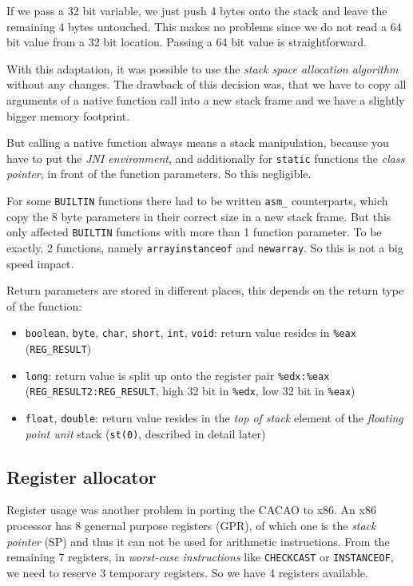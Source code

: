 If we pass a 32 bit variable, we just push 4 bytes onto the stack and
leave the remaining 4 bytes untouched. This makes no problems since we
do not read a 64 bit value from a 32 bit location. Passing a 64 bit
value is straightforward.

With this adaptation, it was possible to use the \textit{stack space
allocation algorithm} without any changes. The drawback of this
decision was, that we have to copy all arguments of a native function
call into a new stack frame and we have a slightly bigger memory
footprint.

But calling a native function always means a stack manipulation,
because you have to put the \textit{JNI environment}, and additionally
for \texttt{static} functions the \textit{class pointer}, in front of
the function parameters. So this negligible.

For some \texttt{BUILTIN} functions there had to be written
\texttt{asm\_} counterparts, which copy the 8 byte parameters in their
correct size in a new stack frame. But this only affected
\texttt{BUILTIN} functions with more than 1 function parameter. To be
exactly, 2 functions, namely \texttt{arrayinstanceof} and
\texttt{newarray}. So this is not a big speed impact.

Return parameters are stored in different places, this depends on the
return type of the function:

\begin{itemize}
 \item \texttt{boolean}, \texttt{byte}, \texttt{char}, \texttt{short},
 \texttt{int}, \texttt{void}: return value resides in \texttt{\%eax}
 (\texttt{REG\_RESULT})

 \item \texttt{long}: return value is split up onto the register pair
 \texttt{\%edx:\%eax}
 (\texttt{REG\_RESULT2:REG\_RESULT}, high 32 bit in
 \texttt{\%edx}, low 32 bit in \texttt{\%eax})

 \item \texttt{float}, \texttt{double}: return value resides in the
 \textit{top of stack} element of the \textit{floating point unit}
 stack (\texttt{st(0)}, described in detail later)
\end{itemize}


\subsection{Register allocator}

Register usage was another problem in porting the CACAO to x86. An x86
processor has 8 genernal purpose registers (GPR), of which one is the
\textit{stack pointer} (SP) and thus it can not be used for arithmetic
instructions. From the remaining 7 registers, in \textit{worst-case
instructions} like \texttt{CHECKCAST} or \texttt{INSTANCEOF}, we need
to reserve 3 temporary registers. So we have 4 registers available.

